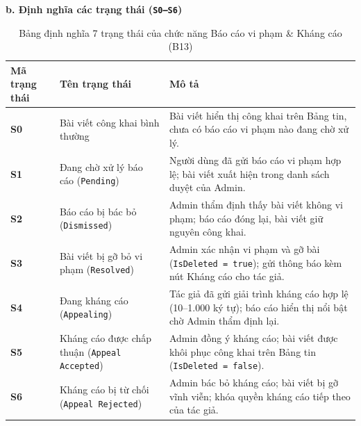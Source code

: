 \documentclass[11pt,a4paper]{article}
\begin{document}
\noindent\textbf{b. Định nghĩa các trạng thái (\texttt{S0--S6})}

\begin{table}[H]
\centering
\small
\begin{tabularx}{\textwidth}{|C{2.4cm}|L{4.8cm}|X|}
\hline
{}
\textbf{Mã trạng thái} & \textbf{Tên trạng thái} & \textbf{Mô tả} \tabularnewline
\hline
\textbf{S0} & Bài viết công khai bình thường & Bài viết hiển thị công khai trên Bảng tin, chưa có báo cáo vi phạm nào đang chờ xử lý. \\ \hline
\textbf{S1} & Đang chờ xử lý báo cáo (\texttt{Pending}) & Người dùng đã gửi báo cáo vi phạm hợp lệ; bài viết xuất hiện trong danh sách duyệt của Admin. \\ \hline
\textbf{S2} & Báo cáo bị bác bỏ (\texttt{Dismissed}) & Admin thẩm định thấy bài viết không vi phạm; báo cáo đóng lại, bài viết giữ nguyên công khai. \\ \hline
\textbf{S3} & Bài viết bị gỡ bỏ vi phạm (\texttt{Resolved}) & Admin xác nhận vi phạm và gỡ bài (\texttt{IsDeleted = true}); gửi thông báo kèm nút Kháng cáo cho tác giả. \\ \hline
\textbf{S4} & Đang kháng cáo (\texttt{Appealing}) & Tác giả đã gửi giải trình kháng cáo hợp lệ (10--1.000 ký tự); báo cáo hiển thị nổi bật chờ Admin thẩm định lại. \\ \hline
\textbf{S5} & Kháng cáo được chấp thuận (\texttt{Appeal Accepted}) & Admin đồng ý kháng cáo; bài viết được khôi phục công khai trên Bảng tin (\texttt{IsDeleted = false}). \\ \hline
\textbf{S6} & Kháng cáo bị từ chối (\texttt{Appeal Rejected}) & Admin bác bỏ kháng cáo; bài viết bị gỡ vĩnh viễn; khóa quyền kháng cáo tiếp theo của tác giả. \\ \hline
\end{tabularx}
\caption{Bảng định nghĩa 7 trạng thái của chức năng Báo cáo vi phạm \& Kháng cáo (B13)}
\end{table}
\end{document}

